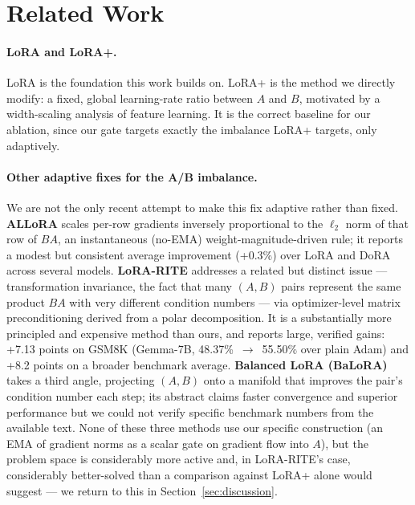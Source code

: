 \documentclass[11pt]{article}
\begin{document}
\section{Related Work}
\label{sec:related}

\paragraph{LoRA and LoRA+.} LoRA \citep{hu2021lora} is the foundation this
work builds on. LoRA+ \citep{hayou2024lora} is the method we directly
modify: a fixed, global learning-rate ratio between $A$ and $B$, motivated
by a width-scaling analysis of feature learning. It is the correct
baseline for our ablation, since our gate targets exactly the imbalance
LoRA+ targets, only adaptively.

\paragraph{Other adaptive fixes for the A/B imbalance.} We are not the
only recent attempt to make this fix adaptive rather than fixed.
\textbf{ALLoRA} \citep{allora2024} scales per-row gradients inversely
proportional to the $\ell_2$ norm of that row of $BA$, an instantaneous
(no-EMA) weight-magnitude-driven rule; it reports a modest but consistent
average improvement (+0.3\%) over LoRA and DoRA across several models.
\textbf{LoRA-RITE} \citep{lorarite2024} addresses a related but distinct
issue — transformation invariance, the fact that many $(A,B)$ pairs
represent the same product $BA$ with very different condition numbers —
via optimizer-level matrix preconditioning derived from a polar
decomposition. It is a substantially more principled and expensive
method than ours, and reports large, verified gains: +7.13 points on
GSM8K (Gemma-7B, 48.37\%~$\to$~55.50\% over plain Adam) and +8.2 points
on a broader benchmark average. \textbf{Balanced LoRA (BaLoRA)}
\citep{balora2026} takes a third angle, projecting $(A,B)$ onto a
manifold that improves the pair's condition number each step; its
abstract claims faster convergence and superior performance but we could
not verify specific benchmark numbers from the available text. None of
these three methods use our specific construction (an EMA of gradient
norms as a scalar gate on gradient flow into $A$), but the problem space
is considerably more active and, in LoRA-RITE's case, considerably
better-solved than a comparison against LoRA+ alone would suggest — we
return to this in Section~\ref{sec:discussion}.
\end{document}
